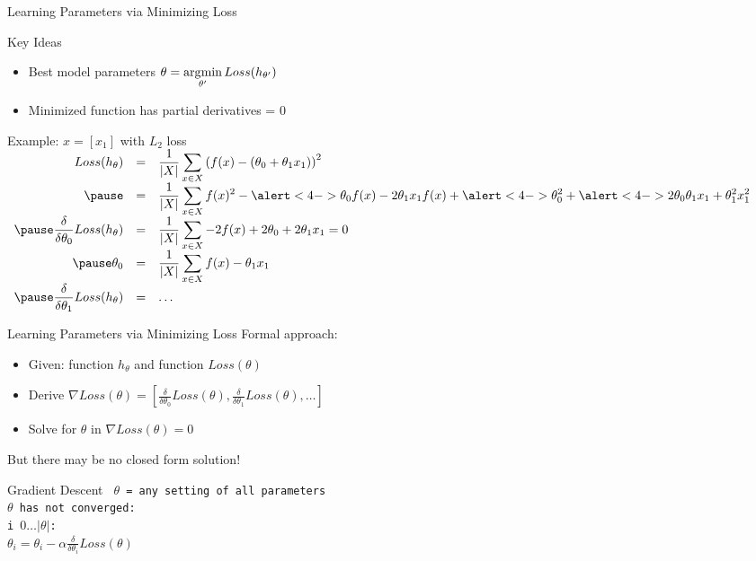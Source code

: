 \documentclass[14pt]{beamer}
\begin{document}
\begin{frame}[label=learning-via-loss]{Learning Parameters via Minimizing Loss}
\begin{block}{Key Ideas}
\begin{itemize}
\item Best model parameters $\theta = \displaystyle\operatorname*{\arg\!\min}_{\theta'} Loss(h_{\theta'})$
\item Minimized function has partial derivatives = 0
\end{itemize}
\end{block}
\pause
Example: $x = [x_1]$ with $L_2$ loss\\
\footnotesize\setlength{\arraycolsep}{0.25em}
$\begin{array}{ >{\displaystyle}r >{\displaystyle}c >{\displaystyle}l }
Loss(h_{\theta})
& = & \frac{1}{|X|}\sum_{x \in X} \left(f(x) - (\theta_0 + \theta_1 x_1)\right)^2\\
\pause
& = & \frac{1}{|X|}\sum_{x \in X} f(x)^2 - \alert<4->{ \theta_0 f(x) } - 2 \theta_1 x_1 f(x) + \alert<4->{ \theta_0^2 } + \alert<4->{ 2 \theta_0 \theta_1 x_1 } + \theta_1^2 x_1^2 \\
\pause
\displaystyle\frac{\delta}{\delta\theta_0} Loss(h_{\theta})
& = & \frac{1}{|X|}\sum_{x \in X} - 2 f(x) + 2 \theta_0 + 2 \theta_1 x_1 = 0\\
\pause
\theta_0
& = & \frac{1}{|X|}\sum_{x \in X} f(x) - \theta_1 x_1 \\
\pause
\displaystyle\frac{\delta}{\delta\theta_1} Loss(h_{\theta}) & = & \ldots \\
\end{array}$
\end{frame}

\begin{frame}[label=gradient-descent]{Learning Parameters via Minimizing Loss}
Formal approach:
\begin{itemize}
\item Given: function $h_{\theta}$ and function $Loss(\theta)$
\item Derive $\nabla Loss(\theta) = [\frac{\delta}{\delta\theta_0} Loss(\theta), \frac{\delta}{\delta\theta_1} Loss(\theta), \ldots]$
\item Solve for $\theta$ in $\nabla Loss(\theta) = 0$
\end{itemize}
\pause
But there may be no closed form solution!
\pause
\begin{block}{Gradient Descent}
\tt
$\theta$ = any setting of all parameters\\
 $\theta$ has not converged:\\
\tab {} i  $0 \ldots |\theta|$:\\
\tab \tab $\displaystyle \theta_i = \theta_i - \alpha \frac{\delta}{\delta\theta_i} Loss(\theta)$
\end{block}
\end{frame}
\end{document}
